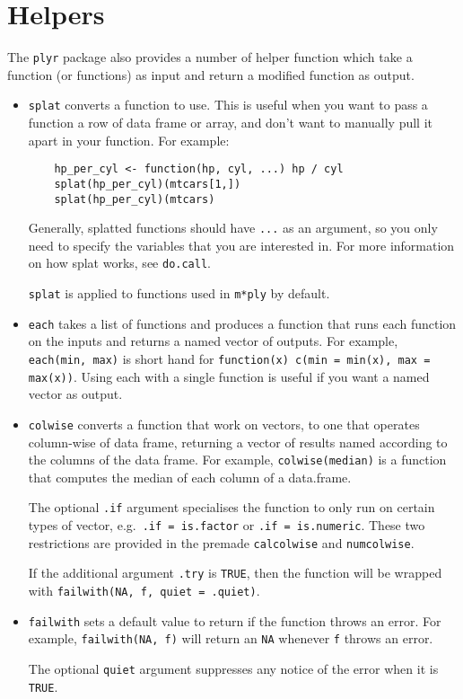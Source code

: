 \documentclass[letterpaper,oneside]{scrartcl}
\begin{document}
\section{Helpers}
\label{sec:helpers}

The {\tt plyr} package also provides a number of helper function which take a function (or functions) as input and return a modified function as output.  

\begin{itemize}
  \item {\tt splat} converts a function to use.  This is useful when you want to pass a function a row of data frame or array, and don't want to manually pull it apart in your function.  For example:
  
  \begin{verbatim}
    hp_per_cyl <- function(hp, cyl, ...) hp / cyl
    splat(hp_per_cyl)(mtcars[1,])
    splat(hp_per_cyl)(mtcars)
  \end{verbatim} 
  
  Generally, splatted functions should have {\tt ...} as an argument, so you only need to specify the variables that you are interested in.  For more information on how splat works, see {\tt do.call}.  
  
  {\tt splat} is applied to functions used in {\tt m*ply} by default.

  \item {\tt each} takes a list of functions and produces a function that runs  each function on the inputs and returns a named vector of outputs.   For example, {\tt each(min, max)} is short hand for {\tt function(x) c(min = min(x), max = max(x))}.  Using each with a single function is useful if you want a named vector as output.

  \item {\tt colwise} converts a function that work on vectors, to one that operates column-wise of data frame, returning a vector of results named according to the columns of the data frame.  For example, {\tt colwise(median)} is a function that computes the median of each column of a data.frame.  
  
  The optional {\tt .if} argument specialises the function to only run on certain types of vector, e.g.\ {\tt .if = is.factor} or {\tt .if = is.numeric}.  These two restrictions are provided in the premade {\tt calcolwise} and {\tt numcolwise}.  
  
  If the additional argument {\tt .try} is {\tt TRUE}, then the function will be wrapped with {\tt failwith(NA, f, quiet = .quiet)}. 
  
  \item {\tt failwith} sets a default value to return if the function throws an error.  For example, {\tt failwith(NA, f)} will return an {\tt NA} whenever {\tt f} throws an error.  
  
  The optional {\tt quiet} argument suppresses any notice of the error when it is {\tt TRUE}.

\end{itemize}
\end{document}
